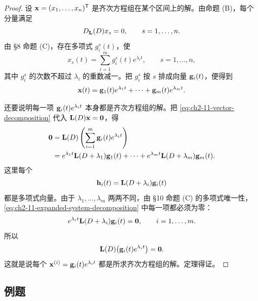 \begin{proof}
设 \(\vect{x}=(x_1,\ldots,x_n)^{\mathsf T}\) 是齐次方程组在某个区间上的解。由命题 (B)，每个分量满足
\[
 D_{\mathbf{L}}(D)x_s=0,
 \qquad s=1,\ldots,n.
\]
由 §8 命题 (C)，存在多项式 \(g_i^s(t)\)，使
\begin{equation}
 x_s(t)=\sum_{i=1}^mg_i^s(t)e^{\lambda_it},
 \qquad s=1,\ldots,n,
 \label{eq:ch2-11-component-decomposition}
\end{equation}
其中 \(g_i^s\) 的次数不超过 \(\lambda_i\) 的重数减一。把 \(g_i^s\) 按 \(s\) 排成向量 \(\vect{g}_i(t)\)，便得到
\begin{equation}
 \vect{x}(t)=\vect{g}_1(t)e^{\lambda_1t}+\cdots+\vect{g}_m(t)e^{\lambda_mt}.
 \label{eq:ch2-11-vector-decomposition}
\end{equation}

还要说明每一项 \(\vect{g}_i(t)e^{\lambda_it}\) 本身都是齐次方程组的解。把 \eqref{eq:ch2-11-vector-decomposition} 代入 \(\mat{L}(D)\vect{x}=\vect{0}\)，得
\begin{align}
 \vect{0}
 &=\mat{L}(D)\left(\sum_{i=1}^m\vect{g}_i(t)e^{\lambda_it}\right)\notag\\
 &=e^{\lambda_1t}\mat{L}(D+\lambda_1)\vect{g}_1(t)+\cdots
   +e^{\lambda_mt}\mat{L}(D+\lambda_m)\vect{g}_m(t).
 \label{eq:ch2-11-expanded-system-decomposition}
\end{align}
这里每个
\[
 \vect{h}_i(t)=\mat{L}(D+\lambda_i)\vect{g}_i(t)
\]
都是多项式向量。由于 \(\lambda_1,\ldots,\lambda_m\) 两两不同，由 §10 命题 (C) 的多项式唯一性，\eqref{eq:ch2-11-expanded-system-decomposition} 中每一项都必须为零：
\begin{equation}
 e^{\lambda_it}\mat{L}(D+\lambda_i)\vect{g}_i(t)=\vect{0},
 \qquad i=1,\ldots,m.
 \label{eq:ch2-11-each-root-term-zero}
\end{equation}
所以
\[
 \mat{L}(D)\bigl(\vect{g}_i(t)e^{\lambda_it}\bigr)=\vect{0}.
\]
这就是说每个 \(\vect{x}^{(i)}=\vect{g}_i(t)e^{\lambda_it}\) 都是所求齐次方程组的解。定理得证。
\end{proof}

\subsection*{例题}

